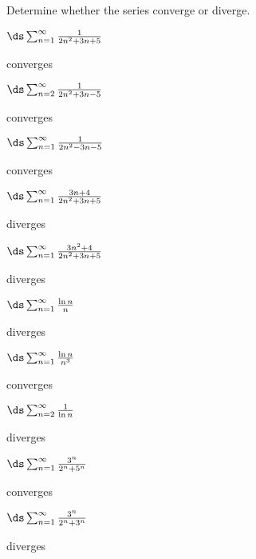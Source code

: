 \begin{exercises}

Determine whether the series converge or diverge.

\twocol

\begin{exercise} $\ds\sum_{n=1}^\infty {1\over 2n^2+3n+5} $
\begin{answer} converges
\end{answer}\end{exercise}

\begin{exercise} $\ds\sum_{n=2}^\infty {1\over 2n^2+3n-5} $
\begin{answer}  converges
\end{answer}\end{exercise}

\begin{exercise} $\ds\sum_{n=1}^\infty {1\over 2n^2-3n-5} $
\begin{answer}  converges
\end{answer}\end{exercise}

\begin{exercise} $\ds\sum_{n=1}^\infty {3n+4\over 2n^2+3n+5} $
\begin{answer} diverges
\end{answer}\end{exercise}

\begin{exercise} $\ds\sum_{n=1}^\infty {3n^2+4\over 2n^2+3n+5} $
\begin{answer} diverges
\end{answer}\end{exercise}

\begin{exercise} $\ds\sum_{n=1}^\infty {\ln n\over n}$
\begin{answer} diverges
\end{answer}\end{exercise}

\begin{exercise} $\ds\sum_{n=1}^\infty {\ln n\over n^3}$
\begin{answer} converges
\end{answer}\end{exercise}

\begin{exercise} $\ds\sum_{n=2}^\infty {1\over \ln n}$
\begin{answer} diverges
\end{answer}\end{exercise}

\begin{exercise} $\ds\sum_{n=1}^\infty {3^n\over 2^n+5^n}$
\begin{answer} converges
\end{answer}\end{exercise}

\begin{exercise} $\ds\sum_{n=1}^\infty {3^n\over 2^n+3^n}$
\begin{answer} diverges
\end{answer}\end{exercise}

\endtwocol

\end{exercises}

